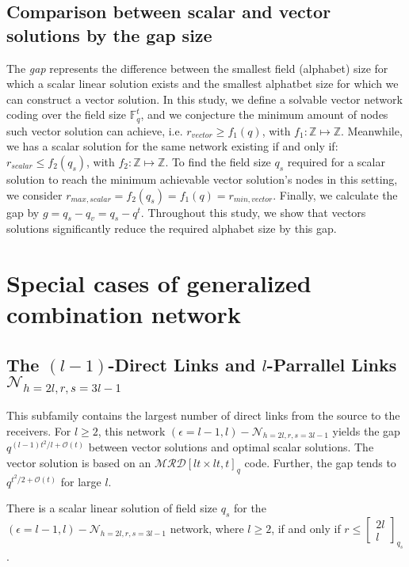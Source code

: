 \subsection{Comparison between scalar and vector solutions by the gap size}

The \textit{gap} represents the difference between the smallest field
(alphabet) size for which a scalar linear solution exists and the
smallest alphatbet size for which we can construct a vector solution.
In this study, we define a solvable vector network coding over the
field size $\ensuremath{\mathbb{F}}_{q}^{t}$, and we conjecture the
minimum amount of nodes such vector solution can achieve, i.e. $r_{vector}\geq f_{1}(q)$,
with $f_{1}:\mathbb{Z}\mapsto\mathbb{Z}$. Meanwhile, we has a scalar
solution for the same network existing if and only if: $r_{scalar}\leq f_{2}\left(q_{s}\right)$,
with $f_{2}:\mathbb{Z}\mapsto\mathbb{Z}$. To find the field size
$q_{s}$ required for a scalar solution to reach the minimum achievable
vector solution's nodes in this setting, we consider $r_{max,scalar}=f_{2}\left(q_{s}\right)=f_{1}(q)=r_{min,vector}$.
Finally, we calculate the gap by $g=q_{s}-q_{v}=q_{s}-q^{t}.$ Throughout
this study, we show that vectors solutions significantly reduce the
required alphabet size by this gap. 

\section{Special cases of generalized combination network}

\subsection{The $(l-1)$-Direct Links and $l$-Parrallel Links $\mathcal{N}_{h=2l,r,s=3l-1}$}

This subfamily contains the largest number of direct links from the
source to the receivers. For $l\geq2$, this network $\left(\epsilon=l-1,l\right)-\mathcal{N}_{h=2l,r,s=3l-1}$
yields the gap $q^{(l-1)t^{2}/l+\mathcal{O}(t)}$ between vector solutions
and optimal scalar solutions. The vector solution is based on an $\mathcal{MRD}\left[lt\times lt,t\right]_{q}$
code. Further, the gap tends to $q^{t^{2}/2+\mathcal{O}(t)}$ for
large $l$.
\begin{lem}
There is a scalar linear solution of field size $q_{s}$ for the $\left(\epsilon=l-1,l\right)-\mathcal{N}_{h=2l,r,s=3l-1}$
network, where $l\geq2$, if and only if $r\leq\left[\begin{array}{c}
2l\\
l
\end{array}\right]_{q_{s}}$.
\end{lem}

